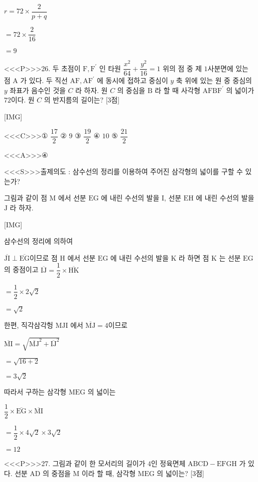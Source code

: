 \documentclass{oblivoir}
\begin{document}
$r=72 \times \dfrac{2}{p+q}$

$=72 \times \dfrac{2}{16}$

$=9$


<<<P>>>26. 두 초점이 $\mathrm{F}, \mathrm{F}^{\prime}$ 인 타원 $\dfrac{x^{2}}{64}+\dfrac{y^{2}}{16}=1$ 위의 점 중 제 $1$사분면에 있는 점 $\mathrm{A}$ 가 있다. 두 직선 $\mathrm{AF}, \mathrm{AF}^{\prime}$ 에 동시에 접하고 중심이 $y$ 축 위에 있는 원 중 중심의 $y$ 좌표가 음수인 것을 $C$ 라 하자. 원 $C$ 의 중심을 $\mathrm{B}$ 라 할 때 사각형 $\mathrm{AFBF}^{\prime}$ 의 넓이가 $72$이다. 원 $C$ 의 반지름의 길이는? [3점]

[IMG]

<<<C>>>① $\dfrac{17}{2}$
② $9$
③ $\dfrac{19}{2}$
④ $10$
⑤ $\dfrac{21}{2}$


<<<A>>>④

<<<S>>>출제의도 : 삼수선의 정리를 이용하여 주어진 삼각형의 넓이를 구할 수 있는가?

그림과 같이 점 $\mathrm{M}$ 에서 선분 $\mathrm{EG}$ 에 내린 수선의 발을 $\mathrm{I}$, 선분 $\mathrm{EH}$ 에 내린 수선의 발을 $\mathrm{J}$ 라 하자.

[IMG]

삼수선의 정리에 의하여

$\overline{\mathrm{JI}} \perp \overline{\mathrm{EG}}$이므로 점 $\mathrm{H}$ 에서 선분 $\mathrm{EG}$ 에 내린 수선의 발을 $\mathrm{K}$ 라 하면 점 $\mathrm{K}$ 는 선분 $\mathrm{EG}$ 의 중점이고
$\overline{\mathrm{IJ}} =\dfrac{1}{2} \times \overline{\mathrm{HK}}$

$=\dfrac{1}{2} \times 2 \sqrt{2}$

$=\sqrt{2}$

한편, 직각삼각헝 $\mathrm{MJI}$ 에서 $\overline{\mathrm{MJ}} =4$이므로

$\overline{\mathrm{MI}} =\sqrt{\overline{\mathrm{MJ}}^{2}+\overline{\mathrm{IJ}}^{2}}$

$=\sqrt{16+2}$

$=3 \sqrt{2}$

따라서 구하는 삼각형 $\mathrm{MEG}$ 의 넓이는

$\dfrac{1}{2} \times \overline{\mathrm{EG}} \times \overline{\mathrm{MI}}$

$=\dfrac{1}{2} \times 4 \sqrt{2} \times 3 \sqrt{2}$

$=12$


<<<P>>>27. 그림과 같이 한 모서리의 길이가 $4$인 정육면체 $\mathrm{ABCD}-\mathrm{EFGH}$ 가 있다. 선분 $\mathrm{AD}$ 의 중점을 $\mathrm{M}$ 이라 할 때, 삼각형 $\mathrm{MEG}$ 의 넓이는? [3점]
\end{document}
